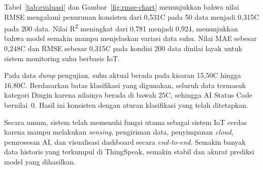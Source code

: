 Tabel~\ref{tab:evaluasi} dan Gambar~\ref{fig:rmse-chart} menunjukkan bahwa
nilai RMSE mengalami penurunan konsisten dari 0,531\textdegree C pada 50 data
menjadi 0,315\textdegree C pada 200 data. Nilai R\textsuperscript{2} meningkat
dari 0,781 menjadi 0,924, menunjukkan bahwa model semakin mampu menjelaskan
variasi data suhu. Nilai MAE sebesar 0,248\textdegree C dan RMSE sebesar
0,315\textdegree C pada kondisi 200 data dinilai layak untuk sistem monitoring
suhu berbasis IoT.

Pada data \textit{dump} pengujian, suhu aktual berada pada kisaran
15,50\textdegree C hingga 16,80\textdegree C. Berdasarkan batas klasifikasi
yang digunakan, seluruh data termasuk kategori Dingin karena nilainya berada
di bawah 25\textdegree C, sehingga AI Status Code bernilai~0. Hasil ini
konsisten dengan aturan klasifikasi yang telah ditetapkan.

Secara umum, sistem telah memenuhi fungsi utama sebagai sistem IoT cerdas
karena mampu melakukan \textit{sensing}, pengiriman data, penyimpanan
\textit{cloud}, pemrosesan AI, dan visualisasi dashboard secara
\textit{end-to-end}. Semakin banyak data historis yang terkumpul di
ThingSpeak, semakin stabil dan akurat prediksi model yang dihasilkan.

